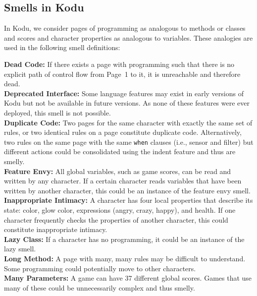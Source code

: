 \documentclass[conference]{IEEEtran}
\begin{document}
\subsection{Smells in Kodu}
In Kodu, we consider pages of programming as analogous to methods or classes and scores and character properties as analogous to variables. These analogies are used in the following smell definitions: 

\noindent \textbf{Dead Code:} If there exists a page with programming such that there is no explicit path of control flow from Page~1 to it, it is unreachable and therefore dead. \\
\textbf{Deprecated Interface:} Some language features may exist in early versions of Kodu but not be available in future versions. As none of these features were ever deployed, this smell is not possible. \\
\textbf{Duplicate Code:} Two pages for the same character with exactly the same set of rules, or two identical rules on a page constitute duplicate code. Alternatively, two rules on the same page with the same {\tt when} clauses (i.e., sensor and filter) but different actions could be consolidated using the indent feature and thus are smelly. \\
\textbf{Feature Envy:} All global variables, such as game scores, can be read and written by any character. If a certain character reads variables that have been written by another character, this could be an instance of the feature envy smell. \\
\textbf{Inappropriate Intimacy:} A character has four local properties that describe its state: color, glow color, expressions (angry, crazy, happy), and health.  If one character frequently checks the properties of another character, this could constitute inappropriate intimacy. \\
\textbf{Lazy Class:} If a character has no programming, it could be an instance of the lazy smell. \\
\textbf{Long Method:} A page with many, many rules may be difficult to understand. Some programming could potentially move to other characters.\\ %
\textbf{Many Parameters:} A game can have 37 different global scores. Games that use many of these could be unnecessarily complex and thus smelly. \\%
\end{document}
